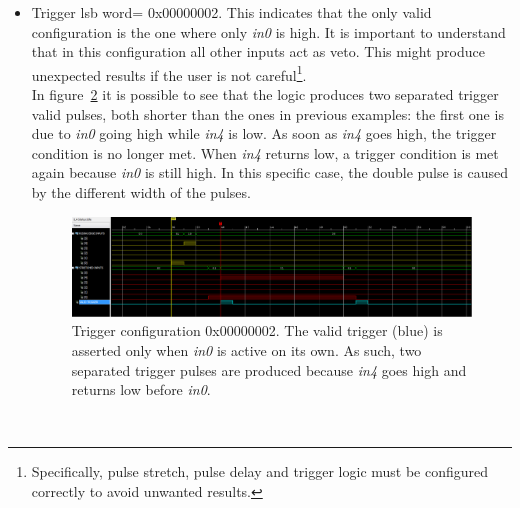 \begin{itemize}
\begin{figure}
            \label{Fig:exampleTrig00020002}
        \end{figure}\\
    \item Trigger \gls{lsb} word= 0x00000002. This indicates that the only valid configuration is the one where only \emph{in0} is high. It is important to understand that in this configuration all other inputs act as veto. This might produce unexpected results if the user is not careful\footnote{Specifically, pulse stretch, pulse delay and trigger logic must be configured correctly to avoid unwanted results.}.\\
        In figure~\ref{Fig:exampleTrig00000002} it is possible to see that the logic produces two separated trigger valid pulses, both shorter than the ones in previous examples: the first one is due to \emph{in0} going high while \emph{in4} is low. As soon as \emph{in4} goes high, the trigger condition is no longer met. When \emph{in4} returns low, a trigger condition is met again because \emph{in0} is still high. In this specific case, the double pulse is caused by the different width of the pulses.
        \begin{figure}
            \centering
            \includegraphics[width=.90\textwidth]{./Images/Trigger0x00000002.png}
            \caption{Trigger configuration 0x00000002. The valid trigger (blue) is asserted only when \emph{in0} is active on its own. As such, two separated trigger pulses are produced because \emph{in4} goes high and returns low before \emph{in0}.}
            \label{Fig:exampleTrig00000002}
        \end{figure}\\
\end{itemize}
